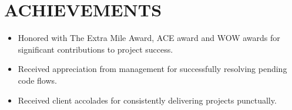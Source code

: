 \documentclass[letterpaper,10pt]{article}
\newcommand{\resumeItem}[1]{
  \item\small{
    {#1 \vspace{-2pt}}
  }
}
\newcommand{\resumeSubHeadingListStart}{\begin{itemize}[leftmargin=0.0in, label={}]}
\newcommand{\resumeSubHeadingListEnd}{\end{itemize}}
\begin{document}
\section{ACHIEVEMENTS}
\resumeSubHeadingListStart
\resumeItem{Honored with The Extra Mile Award, ACE award and WOW awards for significant contributions to project success.}
\resumeItem{Received appreciation from management for successfully resolving pending code flows.}
\resumeItem{Received client accolades for consistently delivering projects punctually.}
\resumeSubHeadingListEnd
\end{document}
